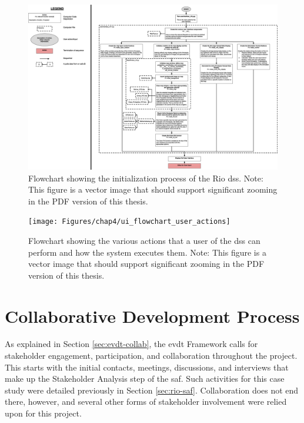 \begin{landscape}

\begin{figure}[t] 
\centering
\includegraphics[scale=0.2]{Figures/chap4/ui_flowchart_initialization}
\caption[Flowchart of Rio DSS Initialization]{Flowchart showing the initialization process of the Rio \ac{dss}. Note: This figure is a vector image that should support significant zooming in the PDF version of this thesis.}
\label{fig:ui_flowchart_initialization}
\end{figure}

\begin{figure}[t] 
\centering
\texttt{[image: Figures/chap4/ui\_flowchart\_user\_actions]}
\caption[Flowchart of Rio DSS Actions]{Flowchart showing the various actions that a user of the \ac{dss} can perform and how the system executes them. Note: This figure is a vector image that should support significant zooming in the PDF version of this thesis.}
\label{fig:ui_flowchart_user_actions}
\end{figure}
\end{landscape}

\section{Collaborative Development Process} \label{sec:rio-collab}

As explained in Section \ref{sec:evdt-collab}, the \ac{evdt} Framework calls for stakeholder engagement, participation, and collaboration throughout the project. This starts with the initial contacts, meetings, discussions, and interviews that make up the Stakeholder Analysis step of the \ac{saf}. Such activities for this case study were detailed previously in Section \ref{sec:rio-saf}. Collaboration does not end there, however, and several other forms of stakeholder involvement were relied upon for this project.


